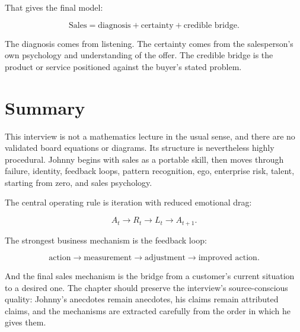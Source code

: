 That gives the final model:

\begin{equation}
\text{Sales}
=
\text{diagnosis}
+
\text{certainty}
+
\text{credible bridge}.
\end{equation}

The diagnosis comes from listening. The certainty comes from the salesperson's own psychology and understanding of the offer. The credible bridge is the product or service positioned against the buyer's stated problem.

\section{Summary}

This interview is not a mathematics lecture in the usual sense, and there are no validated board equations or diagrams. Its structure is nevertheless highly procedural. Johnny begins with sales as a portable skill, then moves through failure, identity, feedback loops, pattern recognition, ego, enterprise risk, talent, starting from zero, and sales psychology.

The central operating rule is iteration with reduced emotional drag:

\begin{equation}
A_t \rightarrow R_t \rightarrow L_t \rightarrow A_{t+1}.
\end{equation}

The strongest business mechanism is the feedback loop:

\begin{equation}
\text{action}
\rightarrow
\text{measurement}
\rightarrow
\text{adjustment}
\rightarrow
\text{improved action}.
\end{equation}

And the final sales mechanism is the bridge from a customer's current situation to a desired one. The chapter should preserve the interview's source-conscious quality: Johnny's anecdotes remain anecdotes, his claims remain attributed claims, and the mechanisms are extracted carefully from the order in which he gives them.